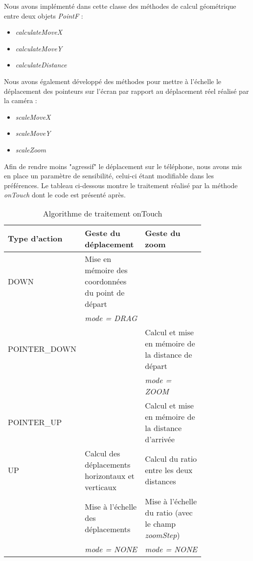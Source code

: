 Nous avons implémenté dans cette classe des méthodes de calcul géométrique entre deux objets \textit{PointF} :
\begin{itemize}
	\item \textit{calculateMoveX}
	\item \textit{calculateMoveY}
	\item \textit{calculateDistance}
\end{itemize}

Nous avons également développé des méthodes pour mettre à l'échelle le déplacement des pointeurs sur l'écran par rapport au déplacement réel réalisé par la caméra :
\begin{itemize}
	\item \textit{scaleMoveX}
	\item \textit{scaleMoveY}
	\item \textit{scaleZoom}
\end{itemize}

Afin de rendre moins "agressif" le déplacement sur le téléphone, nous avons mis en place un paramètre de sensibilité, celui-ci étant
modifiable dans les préférences.
Le tableau ci-dessous montre le traitement réalisé par la méthode
\textit{onTouch} dont le code est présenté après.\newline
\begin{table}[H]
\centering
\begin{tabular}{|p{0.2\linewidth}|p{0.3\linewidth}| p{0.3\linewidth}|}
\hline
Type d'action & Geste du déplacement & Geste du zoom \\
\hline
DOWN & Mise en mémoire des coordonnées du point de départ &  \\
 & \textit{mode = DRAG} & \\
POINTER\_DOWN & & Calcul et mise en mémoire de la distance de départ \\
 & & \textit{mode = ZOOM} \\
POINTER\_UP & & Calcul et mise en mémoire de la distance d'arrivée \\
UP & Calcul des déplacements horizontaux et verticaux & Calcul du ratio entre les deux distances \\
 & Mise à l'échelle des déplacements & Mise à l'échelle du ratio (avec le champ \textit{zoomStep}) \\
 & \textit{mode = NONE} & \textit{mode = NONE} \\
\hline
\end{tabular}
\caption{Algorithme de traitement onTouch}
\end{table}
